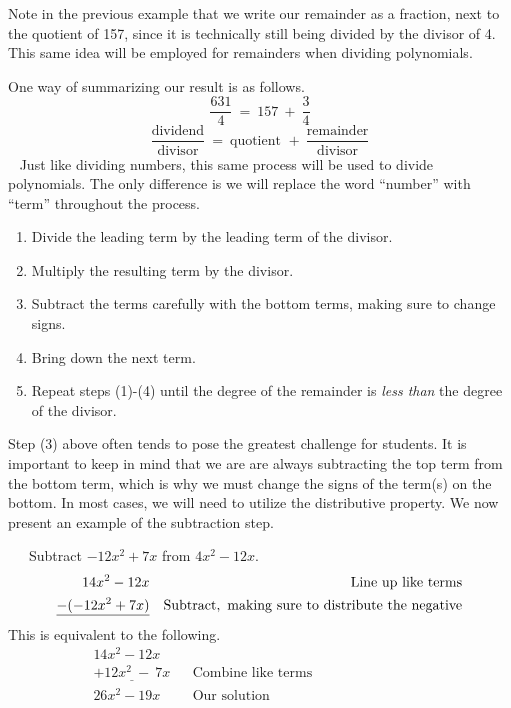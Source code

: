 Note in the previous example that we write our remainder as a fraction, next to the quotient of 157, since it is technically still being divided by the divisor of 4.  This same idea will be employed for remainders when dividing polynomials.\pp

One way of summarizing our result is as follows.
$$\frac{631}{4}~=~157~+~\frac{3}{4}$$ 
$$\frac{\text{dividend}}{\text{divisor}}~=~\text{quotient~}+~\frac{\text{remainder}}{\text{divisor}}$$
~\pp
Just like dividing numbers, this same process will be used to divide polynomials. The only difference is we will replace the word ``number'' with ``term'' throughout the process.

\begin{center}
{}
\end{center}
\begin{enumerate}
  \setcounter{enumi}{0}

  \item Divide the leading term by the leading term of the divisor. 
		
  \item Multiply the resulting term by the divisor.
  
  \item Subtract the terms carefully with the bottom terms, making sure to change signs.
  
  \item Bring down the next term.
  
  \item Repeat steps (1)-(4) until the degree of the remainder is \textit{less than} the degree of the divisor.
  
\end{enumerate}
Step (3) above often tends to pose the greatest challenge for students.  It is important to keep in mind that we are are always subtracting the top term from the bottom term, which is why we must change the signs of the term(s) on the bottom.  In most cases, we will need to utilize the distributive property.  We now present an example of the subtraction step.

\newpage

\begin{example}~~~Subtract $-12x^2+7x$ from $4x^2-12x$. 
 \begin{eqnarray*}
    14x^2 -12x &  & \operatorname{Line~up~like~terms} \\
   \underline{-(-12x^2 +7x)}&  & \operatorname{Subtract,~making~sure~to~distribute~the~negative}\\
	\end{eqnarray*}
This is equivalent to the following.
\begin{eqnarray*}
	14x^2 -12x &  &  \\
    \underline{+12x^2~ -~7x}  &  & \text{Combine~like~terms}~~~~~~~~~~~~~~~~~~~~~~~~~~~~~~~~~~~~~ \\
		26x^2 - 19x & & \text{Our~solution}
	\end{eqnarray*}
\end{example}

